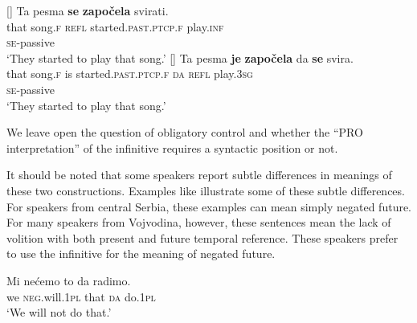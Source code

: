 \documentclass[output=paper,modfonts,newtxmath,hidelinks,]{langscibook}
\begin{document}
\ea \label{7:ex16}
	[]{ \label{7:ex16a2}
		 \gll Ta pesma \textbf{se} \textbf{započela} svirati.\\
         	  that song.\textsc{f} \textsc{refl} started.\textsc{past.ptcp.f} play.\textsc{inf}\\\hfill\textsc{se}-passive\\
		\glt `They started to play that song.'
	}
	[]{ \label{7:ex16b2}
		\gll Ta pesma \textbf{je} \textbf{započela} da \textbf{se} svira.\\
        	 that song.\textsc{f} is started.\textsc{past.ptcp.f} \textsc{da} \textsc{refl} play.\textsc{3sg}\\\hfill\textsc{se}-passive\\
		\glt `They started to play that song.'
	}
	\z
\z

\noindent We leave open the question of obligatory control and whether the ``PRO interpretation'' of the infinitive requires a syntactic position or not. 

It should be noted that some speakers report subtle differences in meanings of these two constructions. Examples like  illustrate some of these subtle differences. For speakers from central Serbia, these examples can mean simply negated future. For many speakers from Vojvodina, however, these sentences mean the lack of volition with both present and future temporal reference. These speakers prefer to use the infinitive for the meaning of negated future.

\ea \label{7:ex17}
\gll Mi nećemo to da radimo.\\
     we \textsc{neg.}will.\textsc{1pl} that \textsc{da} do.\textsc{1pl}\\
\glt `We will not do that.'
\z
\end{document}
